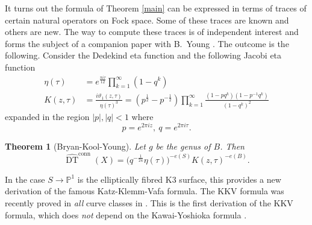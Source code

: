 \documentclass{amsart}
\newtheorem{theorem}{Theorem}%
\theoremstyle{definition}
\newcommand{\PP} {\mathbb{P}}
\newcommand{\DT}{\operatorname{DT}}
\newcommand{\conn}{\operatorname{conn}}
\begin{document}
It turns out the formula of Theorem \ref{main} can be expressed in terms of traces of certain natural operators on Fock space. Some of these traces are known and others are new. The way to compute these traces is of independent interest and forms the subject of a companion paper with B.~Young \cite{BKY}. The outcome is the following. Consider the Dedekind eta function and the following Jacobi eta function \cite{Cha}
\begin{align*}
\eta(\tau) &= e^{\frac{\pi i \tau}{12}}\prod_{k=1}^{\infty}(1-q^k) \\
K(z,\tau) &= \frac{i \vartheta_1(z,\tau)}{\eta(\tau)^3} = (p^{\frac{1}{2}} - p^{-\frac{1}{2}}) \prod_{k=1}^{\infty} \frac{(1-p q^k) (1-p^{-1} q^k)}{(1-q^k)^2}
\end{align*}
expanded in the region $|p|, |q| <1$ where 
$$
p = e^{2 \pi i z}, \ q = e^{2 \pi i \tau}.
$$
\begin{theorem}[Bryan-Kool-Young] \label{final}
Let $g$ be the genus of $B$. Then 
$$
\widehat{\DT}^{\conn}(X) = \big(q^{-\frac{1}{24}}\eta(\tau) \big)^{-e(S)} K(z,\tau)^{-e(B)}.
$$
\end{theorem}
In the case $S \rightarrow \PP^1$ is the elliptically fibred K3 surface, this provides a new derivation of the famous Katz-Klemm-Vafa formula. The KKV formula was recently proved in \emph{all} curve classes in \cite{PT}. This is the first derivation of the KKV formula, which does \emph{not} depend on the Kawai-Yoshioka formula \cite{KY}.
\end{document}
